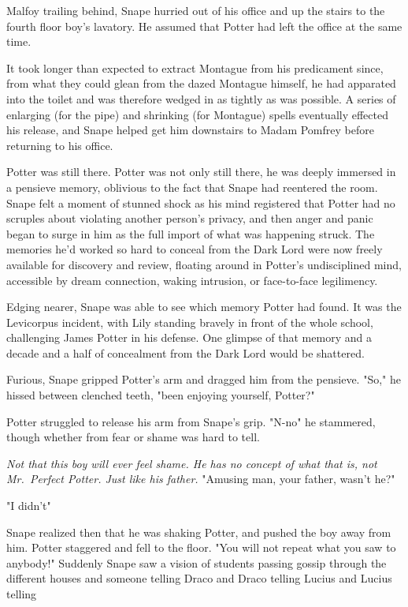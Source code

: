 Malfoy trailing behind, Snape hurried out of his office and up the stairs to the fourth floor boy's lavatory. He assumed that Potter had left the office at the same time.

It took longer than expected to extract Montague from his predicament since, from what they could glean from the dazed Montague himself, he had apparated into the toilet and was therefore wedged in as tightly as was possible. A series of enlarging (for the pipe) and shrinking (for Montague) spells eventually effected his release, and Snape helped get him downstairs to Madam Pomfrey before returning to his office.

Potter was still there. Potter was not only still there, he was deeply immersed in a pensieve memory, oblivious to the fact that Snape had reentered the room. Snape felt a moment of stunned shock as his mind registered that Potter had no scruples about violating another person's privacy, and then anger and panic began to surge in him as the full import of what was happening struck. The memories he'd worked so hard to conceal from the Dark Lord were now freely available for discovery and review, floating around in Potter's undisciplined mind, accessible by dream connection, waking intrusion, or face-to-face legilimency.

Edging nearer, Snape was able to see which memory Potter had found. It was the Levicorpus incident, with Lily standing bravely in front of the whole school, challenging James Potter in his defense. One glimpse of that memory and a decade and a half of concealment from the Dark Lord would be shattered.

Furious, Snape gripped Potter's arm and dragged him from the pensieve. "So," he hissed between clenched teeth, "been enjoying yourself, Potter?"

Potter struggled to release his arm from Snape's grip. "N-no{\el}" he stammered, though whether from fear or shame was hard to tell.

\emph{Not that this boy will ever feel shame. He has no concept of what that is, not Mr.~Perfect Potter. Just like his father.} "Amusing man, your father, wasn't he?"

"I{\el} didn't{\el}"

Snape realized then that he was shaking Potter, and pushed the boy away from him. Potter staggered and fell to the floor. "You will not repeat what you saw to anybody!" Suddenly Snape saw a vision of students passing gossip through the different houses{\el} and someone telling Draco{\el} and Draco telling Lucius{\el} and Lucius telling{\el}

